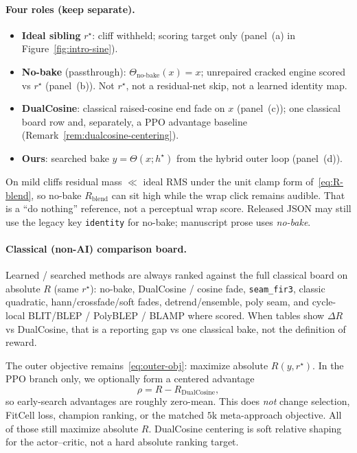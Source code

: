 \paragraph{Four roles (keep separate).}
\label{sec:four-roles}
\begin{itemize}
  \item \textbf{Ideal sibling} $r^{\star}$: cliff withheld; scoring target only (panel~(a) in Figure~\ref{fig:intro-sine}).
  \item \textbf{No-bake} (passthrough): $\Theta_{\mathrm{no\text{-}bake}}(x)=x$; unrepaired cracked engine scored vs $r^{\star}$ (panel~(b)). Not $r^{\star}$, not a residual-net skip, not a learned identity map.
  \item \textbf{DualCosine}: classical raised-cosine end fade on $x$ (panel~(c)); one classical board row and, separately, a PPO advantage baseline (Remark~\ref{rem:dualcosine-centering}).
  \item \textbf{Ours}: searched bake $y=\Theta(x;h^{\star})$ from the hybrid outer loop (panel~(d)).
\end{itemize}
On mild cliffs residual mass $\ll$ ideal RMS under the unit clamp form of~\eqref{eq:R-blend}, so no-bake $R_{\mathrm{blend}}$ can sit high while the wrap click remains audible.
That is a ``do nothing'' reference, not a perceptual wrap score.
Released JSON may still use the legacy key \texttt{identity} for no-bake; manuscript prose uses \emph{no-bake}.

\paragraph{Classical (non-AI) comparison board.}
\label{sec:classical-board}
Learned / searched methods are always ranked against the full classical board on absolute $R$ (same $r^{\star}$):
no-bake, DualCosine / cosine fade, \texttt{seam\_fir3}, classic quadratic, hann/crossfade/soft fades, detrend/ensemble, poly seam, and cycle-local BLIT/BLEP / PolyBLEP / BLAMP where scored.
When tables show $\Delta R$ vs DualCosine, that is a reporting gap vs one classical bake, not the definition of reward.

\begin{remark}
\label{rem:dualcosine-centering}
The outer objective remains~\eqref{eq:outer-obj}: maximize absolute $R(y,r^{\star})$.
In the PPO branch only, we optionally form a centered advantage
\begin{equation}
\label{eq:dualcosine-centering}
\rho = R - R_{\mathrm{DualCosine}},
\end{equation}
so early-search advantages are roughly zero-mean.
This does \emph{not} change selection, FitCell loss, champion ranking, or the matched $5$k meta-approach objective.
All of those still maximize absolute $R$.
DualCosine centering is soft relative shaping for the actor--critic, not a hard absolute ranking target.
\end{remark}

